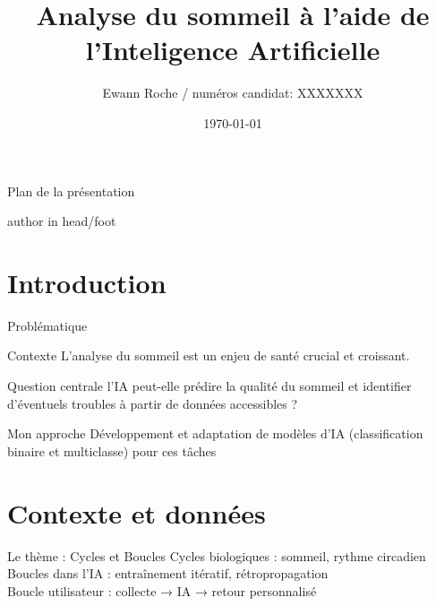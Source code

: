 \documentclass{beamer}
\title[TIPE - Cycles et Boucles]{Analyse du sommeil à l'aide de l'Inteligence Artificielle}
\author{Ewann Roche / numéros candidat: XXXXXXX}
\date{\today}
\begin{document}
{
  \begin{frame}
    \titlepage
  \end{frame}
}

\begin{frame}[plain]{Plan de la présentation}

  \vspace*{2.3cm}
  \begin{center}
    \tableofcontents
  \end{center}
  \vspace{0.5cm}

  \vspace*{2.5cm}
  \begin{beamercolorbox}[wd=\paperwidth,ht=2ex,dp=0.1ex,center]{author in head/foot}
  \end{beamercolorbox}
\end{frame}

\section{Introduction}

\begin{frame}{Problématique}
  \begin{block}{Contexte}
    L'analyse du sommeil est un enjeu de santé crucial et croissant.
  \end{block}

  \begin{block}{Question centrale}
     l'IA peut-elle prédire la qualité du sommeil et identifier d'éventuels troubles à partir de données accessibles ?
  \end{block}

  \begin{block}{Mon approche}
    Développement et adaptation de modèles d'IA (classification binaire et multiclasse) pour ces tâches
  \end{block}
\end{frame}

\section{Contexte et données}

\begin{frame}{Le thème : Cycles et Boucles}
    \centering
    Cycles biologiques : sommeil, rythme circadien\\
    \vspace{0.5cm}
    Boucles dans l'IA : entraînement itératif, rétropropagation\\
    \vspace{0.5cm}
    Boucle utilisateur : collecte → IA → retour personnalisé\\
\end{frame}
\end{document}
